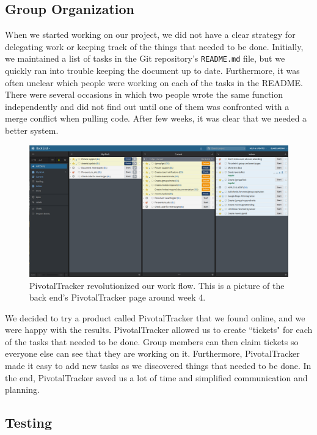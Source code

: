 \documentclass[12pt]{article}
\begin{document}
\subsection{Group Organization}

When we started working on our project, we did not have a clear strategy for 
delegating work or keeping track of the things that needed to be done.
Initially, we maintained a list of tasks in the Git repository's \texttt{README.md} file,
but we quickly ran into trouble keeping the document up to date.
Furthermore, it was often unclear which people were working on each of the tasks in the README.
There were several occasions in which two people wrote the same function independently
and did not find out until one of them was confronted with a merge conflict when pulling code.
After few weeks, it was clear that we needed a better system.

\begin{figure}
    \centering
    \includegraphics[scale=0.3]{pivotaltracker.png}
    \caption{
        PivotalTracker revolutionized our work flow. 
        This is a picture of the back end's PivotalTracker page around week 4.
    }
    \label{fig:pivotaltracker}
\end{figure}

We decided to try a product called PivotalTracker that we found online,
and we were happy with the results.
PivotalTracker allowed us to create ``tickets" for each of the tasks that needed to be done.
Group members can then claim tickets so everyone else can see that they are working on it.
Furthermore, PivotalTracker made it easy to add new tasks as we discovered things that needed to be done.
In the end, PivotalTracker saved us a lot of time and simplified communication and planning.

\subsection{Testing}
\end{document}
